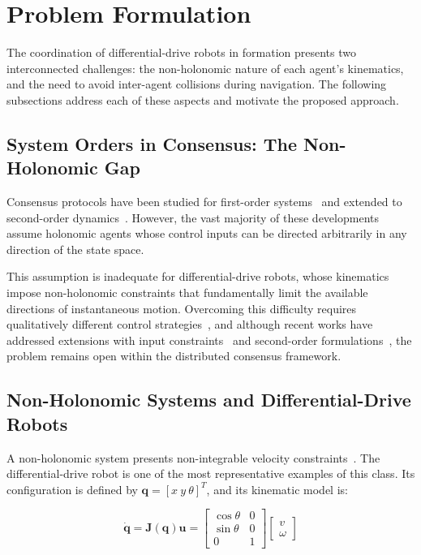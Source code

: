 \section{Problem Formulation}
The coordination of differential-drive robots in formation presents two interconnected challenges: the non-holonomic nature of each agent's kinematics, and the need to avoid inter-agent collisions during navigation. The following subsections address each of these aspects and motivate the proposed approach.

\subsection{System Orders in Consensus: The Non-Holonomic Gap}

Consensus protocols have been studied for first-order systems~\cite{yang2021finitetime} and extended to second-order dynamics~\cite{floresresendiz2023formation}. However, the vast majority of these developments assume holonomic agents whose control inputs can be directed arbitrarily in any direction of the state space.

This assumption is inadequate for differential-drive robots, whose kinematics impose non-holonomic constraints that fundamentally limit the available directions of instantaneous motion. Overcoming this difficulty requires qualitatively different control strategies~\cite{nuno2020consensus}, and although recent works have addressed extensions with input constraints~\cite{nuno2022consensusinput} and second-order formulations~\cite{loria2021observerless}, the problem remains open within the distributed consensus framework.

\subsection{Non-Holonomic Systems and Differential-Drive Robots}

A non-holonomic system presents non-integrable velocity constraints~\cite{bloch2003nonholonomic}. The differential-drive robot is one of the most representative examples of this class. Its configuration is defined by $\mathbf{q} = [x\ y\ \theta]^T$, and its kinematic model is:

\begin{equation}
    \dot{\mathbf{q}} = \mathbf{J}(\mathbf{q})\mathbf{u} =
    \begin{bmatrix}
        \cos\theta & 0 \\
        \sin\theta & 0 \\
        0 & 1
    \end{bmatrix}
    \begin{bmatrix}
        v \\ \omega
    \end{bmatrix}
    \label{eq:unicycle}
\end{equation}

